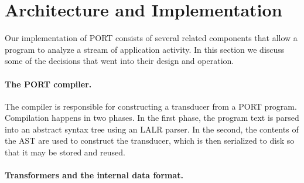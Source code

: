 \section{Architecture and Implementation}

Our implementation of PORT consists of several related
components that allow a program to analyze a stream of
application activity.
In this section we discuss some
of the decisions that went into their design and operation.
\label{SEC:architecture}


\paragraph{The PORT compiler.}

The compiler is responsible for constructing a transducer
from a PORT program.
Compilation happens in two phases.  In the first phase, the program text is
parsed into an abstract syntax tree using an LALR parser.
In the second, the
contents of the AST are used to construct the transducer, which is then serialized to
disk so that it may be stored and reused.

\paragraph{Transformers and the internal data format.}

